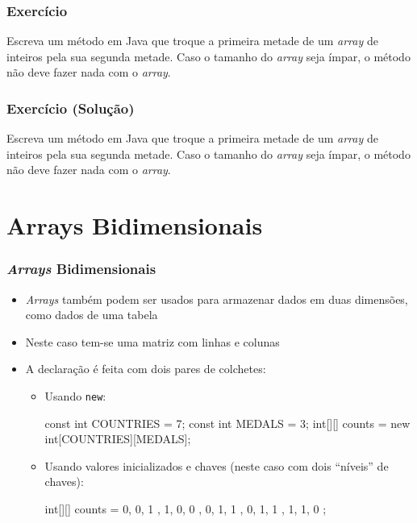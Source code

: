 \documentclass[xcolor={dvipsnames,table},aspectratio=169]{beamer}
\begin{document}
\begin{frame}\frametitle{Exercício}
Escreva um método em Java que troque a primeira metade de um \emph{array} de inteiros pela sua segunda metade. Caso o tamanho do \emph{array} seja ímpar, o método não deve fazer nada com o \emph{array}.
\end{frame}

\begin{frame}[fragile]\frametitle{Exercício (Solução)}
Escreva um método em Java que troque a primeira metade de um \emph{array} de inteiros pela sua segunda metade. Caso o tamanho do \emph{array} seja ímpar, o método não deve fazer nada com o \emph{array}.\\
{\scriptsize
{}
}
\end{frame}

\section{Arrays Bidimensionais}

\begin{frame}[fragile]\frametitle{\emph{Arrays} Bidimensionais}
\begin{itemize}
	\item \emph{Arrays} também podem ser usados para armazenar dados em duas dimensões, como dados de uma tabela
	\item Neste caso tem-se uma matriz com linhas e colunas
	\item A declaração é feita com dois pares de colchetes:
	\begin{itemize}
		\item Usando \texttt{new}:
{\scriptsize
\begin{javacode}
const int COUNTRIES = 7;
const int MEDALS = 3;
int[][] counts = new int[COUNTRIES][MEDALS];
\end{javacode}
}
		\item Usando valores inicializados e chaves (neste caso com dois ``níveis'' de chaves):
{\scriptsize
\begin{javacode}
int[][] counts = {
  { 0, 0, 1 },
  { 1, 0, 0 },
  { 0, 1, 1 },
  { 0, 1, 1 },
  { 1, 1, 0 }
};
\end{javacode}
}
	\end{itemize}
\end{itemize}
\end{frame}
\end{document}
